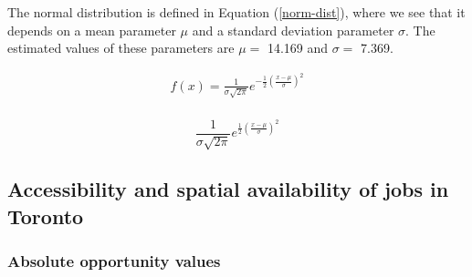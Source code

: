 \documentclass[10pt,letterpaper]{article}
\begin{document}
The normal distribution is defined in Equation (\ref{norm-dist}), where
we see that it depends on a mean parameter \(\mu\) and a standard
deviation parameter \(\sigma\). The estimated values of these parameters
are \(\mu=\) 14.169 and \(\sigma =\) 7.369.

\begin{equation}
\label{norm-dist}
\begin{array}{l} 
f(x) = \frac{1}{\sigma \sqrt{2\pi}}e^{-\frac{1}{2}(\frac{x-\mu}{\sigma})^2}\\
\end{array}
\end{equation}

\[
\frac{1}{\sigma \sqrt{2\pi}}e^{\frac{1}{2}(\frac{x-\mu}{\sigma})^2}
\]

\hypertarget{accessibility-and-spatial-availability-of-jobs-in-toronto}{%
\subsection{Accessibility and spatial availability of jobs in
Toronto}\label{accessibility-and-spatial-availability-of-jobs-in-toronto}}

\hypertarget{absolute-opportunity-values}{%
\subsubsection{Absolute opportunity
values}\label{absolute-opportunity-values}}
\end{document}
